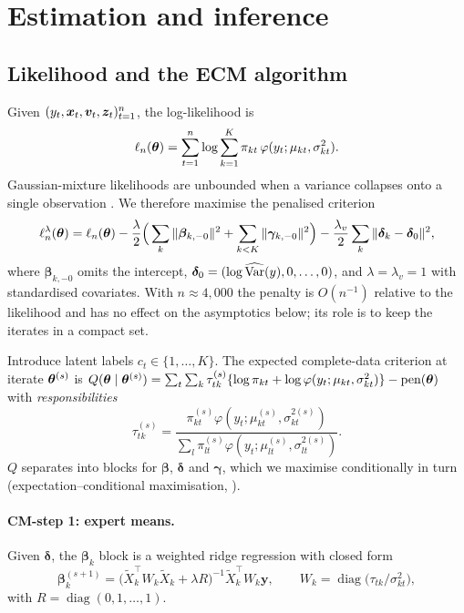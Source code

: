 \section{Estimation and inference}\label{sec:estimation}

\subsection{Likelihood and the ECM algorithm}

Given $(y_t,\bm{x}_t,\bm{v}_t,\bm{z}_t)_{t=1}^n$, the log-likelihood is
\begin{equation}
  \ell_n(\bm{\theta})=\sum_{t=1}^n\log\sum_{k=1}^K\pi_{kt}\,\varphi(y_t;\mu_{kt},\sigma_{kt}^2).
\end{equation}
Gaussian-mixture likelihoods are unbounded when a variance collapses onto a single observation
\citep{kiefer1956consistency}. We therefore maximise the penalised criterion
\begin{equation}\label{eq:penal}
  \ell_n^{\lambda}(\bm{\theta})=\ell_n(\bm{\theta})-\frac{\lambda}{2}\Big(\sum_k\|\bm\beta_{k,-0}\|^2+\sum_{k<K}\|\bm\gamma_{k,-0}\|^2\Big)
  -\frac{\lambda_v}{2}\sum_k\|\bm\delta_k-\bm\delta_0\|^2,
\end{equation}
where $\bm\beta_{k,-0}$ omits the intercept, $\bm\delta_0=(\log\widehat{\operatorname{Var}}(y),0,\dots,0)$, and
$\lambda=\lambda_v=1$ with standardised covariates. With $n\approx 4{,}000$ the penalty is
$O(n^{-1})$ relative to the likelihood and has no effect on the asymptotics below; its role is to
keep the iterates in a compact set.

Introduce latent labels $c_t\in\{1,\dots,K\}$. The expected complete-data criterion at iterate
$\bm{\theta}^{(s)}$ is
$Q(\bm{\theta}\mid\bm{\theta}^{(s)})=\sum_t\sum_k\tau_{tk}^{(s)}\{\log\pi_{kt}+\log\varphi(y_t;\mu_{kt},\sigma^2_{kt})\}-\text{pen}(\bm{\theta})$
with \emph{responsibilities}
\begin{equation}
  \tau_{tk}^{(s)}=\frac{\pi_{kt}^{(s)}\varphi(y_t;\mu^{(s)}_{kt},\sigma^{2(s)}_{kt})}{\sum_l\pi_{lt}^{(s)}\varphi(y_t;\mu^{(s)}_{lt},\sigma^{2(s)}_{lt})}.
\end{equation}
$Q$ separates into blocks for $\bm\beta$, $\bm\delta$ and $\bm\gamma$, which we maximise
conditionally in turn (expectation--conditional maximisation, \citealp{meng1993maximum}).

\paragraph{CM-step 1: expert means.} Given $\bm\delta$, the $\bm\beta_k$ block is a weighted ridge
regression with closed form
\begin{equation}\label{eq:mstep-beta}
  \bm\beta_k^{(s+1)}=\big(\tilde X_k^\top W_k\tilde X_k+\lambda R\big)^{-1}\tilde X_k^\top W_k\bm y,\qquad
  W_k=\operatorname{diag}\big(\tau_{tk}/\sigma^2_{kt}\big),
\end{equation}
with $R=\operatorname{diag}(0,1,\dots,1)$.

